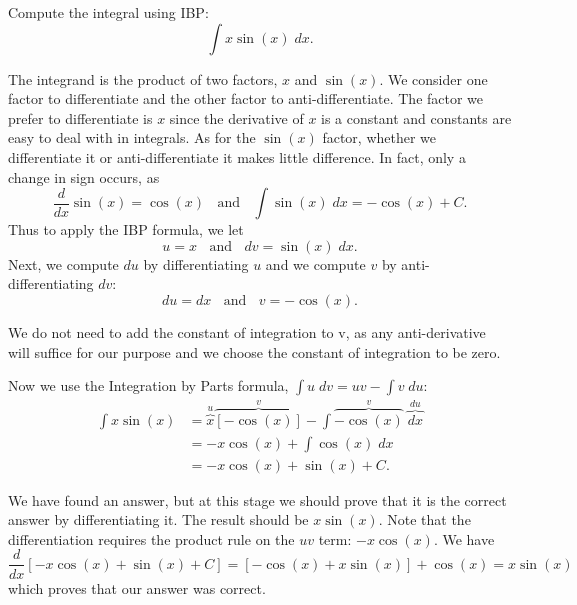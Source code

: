 \documentclass{ximera}
\begin{document}
\begin{example}[example 1] %
Compute the integral using IBP:
  \[
  \int x\sin(x) \;dx.
  \]
  
  The integrand is the product of two factors, $x$ and $\sin(x)$.  We consider one factor to differentiate and the other factor to anti-differentiate.
  The factor we prefer to differentiate is $x$ since the derivative of $x$ is a constant and constants are easy to deal with in integrals.
  As for the $\sin(x)$ factor, whether we differentiate it or anti-differentiate it makes little difference.  In fact, only a change in sign occurs,
  as 
  \[\frac{d}{dx}{\sin(x)} = \cos(x) \;\;  \text{    and    }\;\;   \int \sin(x) \;dx = -\cos(x) + C.\]
  Thus to apply the IBP formula, we let
  \[u=x \;\;\text{   and    }  \;\; dv = \sin(x) \;dx.\]
  Next, we compute $du$ by differentiating $u$ and we compute $v$ by anti-differentiating $dv$: 
  \[du = dx  \;\;  \text{    and    }\;\;    v = -\cos(x).\]
  \begin{remark} 
  We do not need to add the constant of integration to v, as any anti-derivative will suffice 
  for our purpose and we choose the constant of integration to be zero.
  \end{remark}
  Now we use the Integration by Parts formula, $\int u\;dv = uv-\int v\; du$:
  \begin{align*}
  \int x\sin(x) &= \overbrace{x}^{u}\overbrace{[-\cos(x)]}^{v} - \int \overbrace{-\cos(x)}^{v} \;\overbrace{dx}^{du}\\
                &= -x\cos(x) + \int \cos(x) \;dx\\
                &= -x\cos(x) + \sin(x) + C.
 \end{align*}
 
  We have found an answer, but at this stage we should prove that it is the correct answer by differentiating it.  The result should be $x\sin(x)$.
  Note that the differentiation requires the product rule on the $uv$ term: $-x\cos(x)$.
  We have
  \[
  \frac{d}{dx}{\left[-x\cos(x) + \sin(x) + C\right]} = [-\cos(x) + x\sin(x)] + \cos(x) = x\sin(x)
  \]
  which proves that our answer was correct.
  
    
\end{example}

\end{document}
